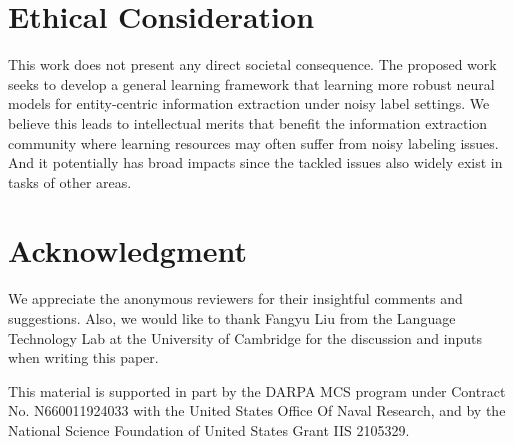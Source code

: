 \documentclass[11pt]{article}
\begin{document}
\section*{Ethical Consideration}
This work does not present any direct societal consequence. The proposed work seeks to develop a general learning framework that learning more robust neural models for entity-centric information extraction under noisy label settings. We believe this leads to intellectual merits that benefit the information extraction community where learning resources may often suffer from noisy labeling issues. And it potentially has broad impacts since the tackled issues also widely exist in tasks of other areas.

\section*{Acknowledgment}

We appreciate the anonymous reviewers for their insightful comments and suggestions. 
Also, we would like to thank Fangyu Liu from the Language Technology Lab at the University of Cambridge for the discussion and inputs when writing this paper.

This material is supported in part by the DARPA MCS program under Contract No. N660011924033 with the United States Office Of Naval Research, and by the National Science Foundation of United States Grant IIS 2105329.



\end{document}
